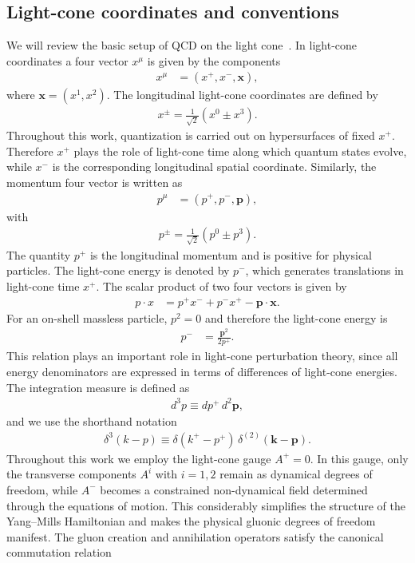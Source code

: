 \documentclass[a4paper,11pt]{article}
\def\v#1{\mathbf{#1}}
\begin{document}
\subsection{Light-cone coordinates and conventions}
We will review the basic setup of QCD on the light cone~\cite{harindranath1996introduction,burkardt1996light,pritchard1980qcd}. In light-cone coordinates a four vector $x^{\mu}$ is given by the components
\begin{align}
    x^{\mu} & = (x^{+},x^{-},\v{x}),
\end{align}
where $\v{x} = (x^{1},x^{2})$. The longitudinal light-cone coordinates are defined by
\begin{align}
x^{\pm} = \frac{1}{\sqrt{2}}(x^{0}\pm x^{3}).
\end{align}
Throughout this work, quantization is carried out on hypersurfaces of fixed $x^{+}$. Therefore $x^{+}$ plays the role of light-cone time along which quantum states evolve, while $x^{-}$ is the corresponding longitudinal spatial coordinate. Similarly, the momentum four vector is written as
\begin{align}
p^{\mu} & = (p^{+},p^{-},\v{p}),
\end{align}
with
\begin{align}
p^{\pm} = \frac{1}{\sqrt{2}}(p^{0}\pm p^{3}).
\end{align}
The quantity $p^{+}$ is the longitudinal momentum and is positive for physical particles. The light-cone energy is denoted by $p^{-}$, which generates translations in light-cone time $x^{+}$. The scalar product of two four vectors is given by
\begin{align}
p\cdot x & = p^{+}x^{-}+p^{-}x^{+}-\v{p}\cdot\v{x}.
\end{align}
For an on-shell massless particle, $p^{2} = 0$ and therefore the light-cone energy is
\begin{align} \label{eq:disper}
p^{-} & = \frac{\v{p}^{2}}{2p^{+}}.
\end{align}
This relation plays an important role in light-cone perturbation theory, since all energy denominators are expressed in terms of differences of light-cone energies. The integration measure is defined as
\begin{align}
d^{3}p \equiv dp^{+}\,d^{2}\v{p},
\end{align}
and we use the shorthand notation
\begin{align}
\delta^{3}(k-p) \equiv \delta(k^{+}-p^{+})\,\delta^{(2)}(\v{k}-\v{p}).
\end{align}
Throughout this work we employ the light-cone gauge $A^{+} = 0$. In this gauge, only the transverse components $A^{i}$ with $i=1,2$ remain as dynamical degrees of freedom, while $A^{-}$ becomes a constrained non-dynamical field determined through the equations of motion. This considerably simplifies the structure of the Yang–Mills Hamiltonian and makes the physical gluonic degrees of freedom manifest. The gluon creation and annihilation operators satisfy the canonical commutation relation
\end{document}
